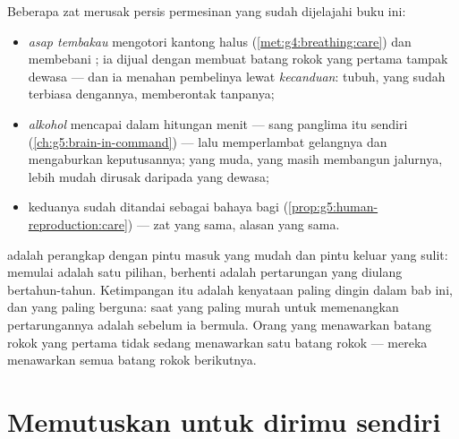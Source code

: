 \begin{proposition}\label{prop:g5:healthy-choices:substances}
Beberapa zat merusak persis permesinan yang sudah dijelajahi buku ini:
\begin{itemize}
  \item \emph{asap tembakau} mengotori kantong halus 
        (\cref{met:g4:breathing:care}) dan membebani ; ia
        dijual dengan membuat batang rokok yang pertama tampak dewasa
        --- dan ia menahan pembelinya lewat
        \emph{kecanduan}: tubuh, yang sudah terbiasa
        dengannya, memberontak tanpanya;
  \item \emph{alkohol} mencapai  dalam hitungan menit --- sang
        panglima itu sendiri
        (\cref{ch:g5:brain-in-command}) --- lalu memperlambat
        gelangnya dan mengaburkan keputusannya;  yang muda, yang
        masih membangun jalurnya, lebih mudah dirusak daripada 
        yang dewasa;
  \item keduanya sudah ditandai sebagai bahaya bagi 
        (\cref{prop:g5:human-reproduction:care}) --- zat yang sama,
        alasan yang sama.
\end{itemize}
\end{proposition}
\admitted

\begin{remark}\label{rem:g5:healthy-choices:never}
 adalah perangkap dengan pintu masuk yang mudah dan pintu
keluar yang sulit: memulai adalah satu pilihan, berhenti adalah
pertarungan yang diulang bertahun-tahun. Ketimpangan itu adalah
kenyataan paling dingin dalam bab ini, dan yang paling berguna: saat
yang paling murah untuk memenangkan pertarungannya adalah sebelum ia
bermula. Orang yang menawarkan batang rokok yang pertama tidak sedang
menawarkan satu batang rokok --- mereka menawarkan semua batang
rokok berikutnya.
\end{remark}

\section{Memutuskan untuk dirimu sendiri}

